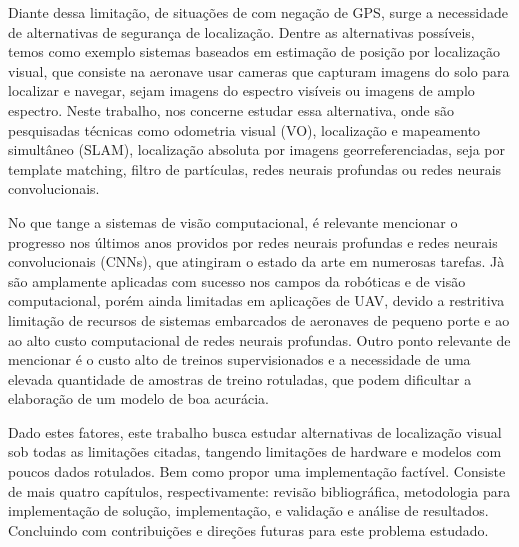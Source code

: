 Diante dessa limitação, de situações de com negação de GPS, surge a necessidade de alternativas de segurança de localização. Dentre as alternativas possíveis, temos como exemplo sistemas baseados em estimação de posição por localização visual, que consiste na aeronave usar cameras que capturam imagens do solo para localizar e navegar, sejam imagens do espectro visíveis ou imagens de amplo espectro. Neste trabalho, nos concerne estudar essa alternativa, onde são pesquisadas técnicas como odometria visual (VO), localização e mapeamento simultâneo (SLAM), localização absoluta por imagens georreferenciadas, seja por template matching, filtro de partículas, redes neurais profundas ou redes neurais convolucionais.

No que tange a sistemas de visão computacional, é relevante mencionar o progresso nos últimos anos providos por redes neurais profundas e redes neurais convolucionais (CNNs), que atingiram o estado da arte em numerosas tarefas. Jà são amplamente aplicadas com sucesso nos campos da robóticas e de visão computacional, porém ainda limitadas em aplicações de UAV, devido a restritiva limitação de recursos de sistemas embarcados de aeronaves de pequeno porte e ao ao alto custo computacional de redes neurais profundas. Outro ponto relevante de mencionar é o custo alto de treinos supervisionados e a necessidade de uma elevada quantidade de amostras de treino rotuladas, que podem dificultar a elaboração de um modelo de boa acurácia.

Dado estes fatores, este trabalho busca estudar alternativas de localização visual sob todas as limitações citadas, tangendo limitações de hardware e modelos com poucos dados rotulados. Bem como propor uma implementação factível. Consiste de mais quatro capítulos, respectivamente: revisão bibliográfica, metodologia para implementação de solução, implementação, e validação e análise de resultados. Concluindo com contribuições e direções futuras para este problema estudado.
